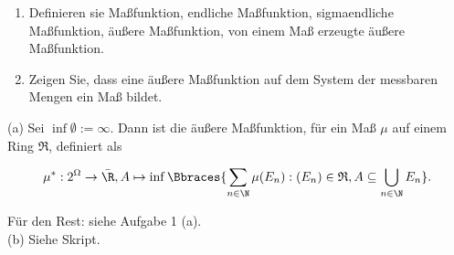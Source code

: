 
\begin{exercise}

\phantom{}

\begin{enumerate}[label = (\alph*)]

  \item
  Definieren sie Maßfunktion, endliche Maßfunktion, sigmaendliche Maßfunktion, äußere Maßfunktion, von einem Maß erzeugte äußere Maßfunktion.
  
  \item
  Zeigen Sie, dass eine äußere Maßfunktion auf dem System der messbaren Mengen ein Maß bildet.

\end{enumerate}

\end{exercise}


\begin{solution}

(a) Sei $\inf \emptyset := \infty$. Dann ist die äußere Maßfunktion, für ein Maß $\mu$ auf einem Ring $\mathfrak{R}$, definiert als

\begin{align*}
  \mu^\ast:
  2^\Omega \to \bar \R,
  A \mapsto \inf \Bbraces{\sum_{n \in \N} \mu(E_n): (E_n) \in \mathfrak{R}, A \subseteq \bigcup_{n \in \N} E_n}.
\end{align*}

Für den Rest: siehe Aufgabe 1 (a). \\

(b) Siehe Skript.

\end{solution}

